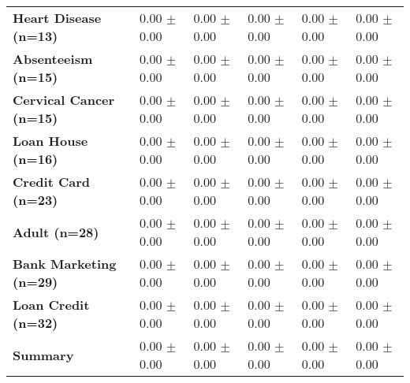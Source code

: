 \begin{table}[htb]
{\begin{tabular}{llllll}
\textbf{Heart Disease (n=13)                     } &  \phantom{0}0.00 $\pm$ \phantom{0}0.00 &             \phantom{0}0.00 $\pm$ \phantom{0}0.00 &  \phantom{0}0.00 $\pm$ \phantom{0}0.00 &  \phantom{0}0.00 $\pm$ \phantom{0}0.00 &  \phantom{0}0.00 $\pm$ \phantom{0}0.00 \\
\textbf{Absenteeism (n=15)                       } &  \phantom{0}0.00 $\pm$ \phantom{0}0.00 &             \phantom{0}0.00 $\pm$ \phantom{0}0.00 &  \phantom{0}0.00 $\pm$ \phantom{0}0.00 &  \phantom{0}0.00 $\pm$ \phantom{0}0.00 &  \phantom{0}0.00 $\pm$ \phantom{0}0.00 \\
\textbf{Cervical Cancer (n=15)                   } &  \phantom{0}0.00 $\pm$ \phantom{0}0.00 &             \phantom{0}0.00 $\pm$ \phantom{0}0.00 &  \phantom{0}0.00 $\pm$ \phantom{0}0.00 &  \phantom{0}0.00 $\pm$ \phantom{0}0.00 &  \phantom{0}0.00 $\pm$ \phantom{0}0.00 \\
\textbf{Loan House (n=16)                        } &  \phantom{0}0.00 $\pm$ \phantom{0}0.00 &             \phantom{0}0.00 $\pm$ \phantom{0}0.00 &  \phantom{0}0.00 $\pm$ \phantom{0}0.00 &  \phantom{0}0.00 $\pm$ \phantom{0}0.00 &  \phantom{0}0.00 $\pm$ \phantom{0}0.00 \\
\textbf{Credit Card (n=23)                       } &  \phantom{0}0.00 $\pm$ \phantom{0}0.00 &             \phantom{0}0.00 $\pm$ \phantom{0}0.00 &  \phantom{0}0.00 $\pm$ \phantom{0}0.00 &  \phantom{0}0.00 $\pm$ \phantom{0}0.00 &  \phantom{0}0.00 $\pm$ \phantom{0}0.00 \\
\textbf{Adult (n=28)                             } &  \phantom{0}0.00 $\pm$ \phantom{0}0.00 &             \phantom{0}0.00 $\pm$ \phantom{0}0.00 &  \phantom{0}0.00 $\pm$ \phantom{0}0.00 &  \phantom{0}0.00 $\pm$ \phantom{0}0.00 &  \phantom{0}0.00 $\pm$ \phantom{0}0.00 \\
\textbf{Bank Marketing (n=29)                    } &  \phantom{0}0.00 $\pm$ \phantom{0}0.00 &             \phantom{0}0.00 $\pm$ \phantom{0}0.00 &  \phantom{0}0.00 $\pm$ \phantom{0}0.00 &  \phantom{0}0.00 $\pm$ \phantom{0}0.00 &  \phantom{0}0.00 $\pm$ \phantom{0}0.00 \\
\textbf{Loan Credit (n=32)                       } &  \phantom{0}0.00 $\pm$ \phantom{0}0.00 &             \phantom{0}0.00 $\pm$ \phantom{0}0.00 &  \phantom{0}0.00 $\pm$ \phantom{0}0.00 &  \phantom{0}0.00 $\pm$ \phantom{0}0.00 &  \phantom{0}0.00 $\pm$ \phantom{0}0.00 \\
\midrule
\textbf{Summary                                  } &  \phantom{0}0.00 $\pm$ \phantom{0}0.00 &             \phantom{0}0.00 $\pm$ \phantom{0}0.00 &  \phantom{0}0.00 $\pm$ \phantom{0}0.00 &  \phantom{0}0.00 $\pm$ \phantom{0}0.00 &  \phantom{0}0.00 $\pm$ \phantom{0}0.00 \\

\end{tabular}}
\end{table}
